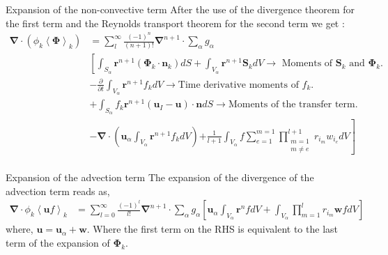 \documentclass{sintefbeamer}
\newcommand{\kavg}[1]{\left<#1\right>_k}
\newcommand{\nablab}{\bm{\nabla}}
\newcommand{\pddt}{\frac{\partial}{\partial t}}
\begin{document}
\begin{frame}
  {Expansion of the non-convective term}
  After the use of the divergence theorem for the first term and the Reynolds transport theorem for the second term we get :
  \begin{align*}
    \nablab \cdot
    (\phi_k \kavg{\bm{\Phi}})
    & =\sum_l^\infty
    \frac{(-1)^{n}}{(n+1)!}
    \nablab^{n+1}
    \cdot
    \sum_{\alpha}
    g_{\alpha} \\
  &\left[
    \int_{S_\alpha}
    \textbf{r}^{n+1}
    (\bm{\Phi}_k \cdot \textbf{n}_k) dS
    \right.
      +\int_{V_\alpha}
      \textbf{r}^{n+1}
      \textbf{S}_k dV \rightarrow \text{    Moments of $\textbf{S}_k$ and $\bm{\Phi}_k$.}\\
      &- \pddt
      \int_{V_\alpha}
      \textbf{r}^{n+1}  f_k dV \rightarrow \text{Time derivative moments of $f_k$.}\\
      &
        + \int_{S_\alpha} 
          f_k\textbf{r}^{n+1} 
          \left(\textbf{u}_I - \textbf{u}\right) \cdot \textbf{n}dS
          \rightarrow \text{Moments of the transfer term.}\\
      &- \nablab \cdot\left(
        \textbf{u}_\alpha 
        \int_{V_\alpha}
        \textbf{r}^{n+1}  f_k dV
      \right)
      \left.+\frac{1}{l+1}\int_{V_\alpha}
      f\sum_{e=1}^{m=1} 
      \prod^{l+1}_{\substack{m=1\\ m\neq e}} 
      r_{i_m} 
      w_{i_e}
      dV\right]\\
  \end{align*}
\end{frame}

\begin{frame}
  {Expansion of the advection term}
  The expansion of the divergence of the advection term reads as, 
  \begin{align*}
    \nablab \cdot \phi_k \kavg{\textbf{u} f}
    &= \sum_{l=0}^\infty  
    \frac{(-1)^l}{l!} 
    \nablab^{n+1} \cdot
    \sum_\alpha  g_\alpha 
    \left[
      \textbf{u}_\alpha  \int_{V_\alpha} \textbf{r}^{n} f dV
    + \int_{V_\alpha} \prod^l_{m=1}r_{i_m} \textbf{w} f dV
    \right]
    \label{ap:eq:partial_uf}
\end{align*}
where, $\textbf{u} = \textbf{u}_\alpha + \textbf{w}$.
Where the first term on the RHS is equivalent to the last term of the expansion of $\bm{\Phi}_k$.
\end{frame}
\end{document}
